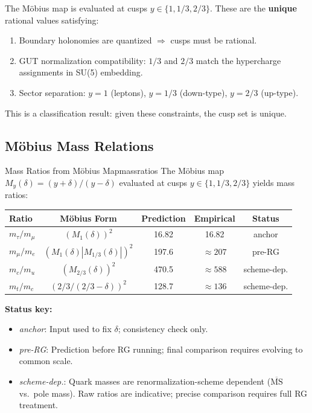 \begin{tcolorbox}[colback=gray!5, colframe=gray!50, 
    title={\textbf{Why These Cusps?}}, fonttitle=\bfseries\small]
The M\"obius map is evaluated at cusps $y \in \{1, 1/3, 2/3\}$. These are the 
\textbf{unique} rational values satisfying:
\begin{enumerate}[leftmargin=1.5em, topsep=2pt, itemsep=1pt]
    \item Boundary holonomies are quantized $\Rightarrow$ cusps must be rational.
    \item GUT normalization compatibility: $1/3$ and $2/3$ match the hypercharge 
        assignments in SU(5) embedding.
    \item Sector separation: $y = 1$ (leptons), $y = 1/3$ (down-type), $y = 2/3$ (up-type).
\end{enumerate}
This is a classification result: given these constraints, the cusp set is unique.
\end{tcolorbox}

\subsection{M\"obius Mass Relations}

\begin{corollary}{Mass Ratios from M\"obius Map}{massratios}
The M\"obius map $M_y(\delta) = (y + \delta)/(y - \delta)$ evaluated at 
cusps $y \in \{1, 1/3, 2/3\}$ yields mass ratios:

\begin{center}
\begin{tabular}{@{}lcccc@{}}
\toprule
\textbf{Ratio} & \textbf{M\"obius Form} & \textbf{Prediction} & \textbf{Empirical} & \textbf{Status}\\
\midrule
$m_\tau/m_\mu$ & $(M_1(\delta))^2$ & 16.82 & 16.82 & anchor\\
$m_\mu/m_e$ & $(M_1(\delta)|M_{1/3}(\delta)|)^2$ & 197.6 & $\approx 207$ & pre-RG\\
$m_c/m_u$ & $(M_{2/3}(\delta))^2$ & 470.5 & $\approx 588$ & scheme-dep.\\
$m_t/m_c$ & $(2/3/(2/3-\delta))^2$ & 128.7 & $\approx 136$ & scheme-dep.\\
\bottomrule
\end{tabular}
\end{center}

\textbf{Status key:}
\begin{itemize}[leftmargin=1.5em, topsep=2pt, itemsep=1pt]
    \item \textit{anchor}: Input used to fix $\delta$; consistency check only.
    \item \textit{pre-RG}: Prediction before RG running; final comparison requires 
        evolving to common scale.
    \item \textit{scheme-dep.}: Quark masses are renormalization-scheme dependent 
        ($\overline{\text{MS}}$ vs.\ pole mass). Raw ratios are indicative; 
        precise comparison requires full RG treatment.
\end{itemize}
\end{corollary}

